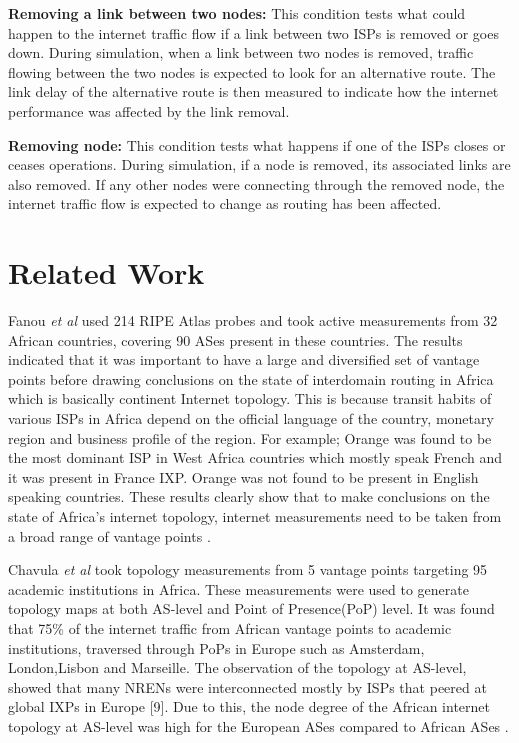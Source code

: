 \textbf{Removing a link between two nodes:} This condition tests what could happen to the internet traffic flow if a link between two ISPs  is removed or goes down. During simulation, when a link between two nodes is removed, traffic flowing between the two nodes is expected to look for an alternative route. The link delay of the alternative route is then measured to indicate how the internet performance was affected by the link removal. 

\textbf{Removing node:} This condition tests what happens if one of the ISPs closes or ceases operations. During simulation, if a node is removed, its associated links are also removed. If any other nodes were connecting through the removed node, the internet traffic flow is expected to change as routing has been affected.  


\section{Related Work}\label{sec:Related Work}
Fanou \textit{et al} \cite{Africa3} used 214 RIPE Atlas probes and took active measurements from 32 African countries, covering 90 ASes present in these countries. The results indicated that it was important to have a large and diversified set of vantage points before drawing conclusions on the state of interdomain routing in Africa which is basically continent Internet topology. This is because transit habits of various ISPs in Africa depend on the official language of the country, monetary region and business profile of the region. For example; Orange was found to be the most dominant ISP in West Africa countries which mostly speak French and it was present in France IXP. Orange was not found to be present in English speaking countries. These results clearly show that to make conclusions on the state of Africa’s internet topology, internet measurements need to be taken from a broad range of vantage points \cite{Africa3}.

Chavula \textit{et al} \cite{Africa2}  took topology measurements from 5 vantage points targeting 95 academic institutions in Africa. These measurements were used to generate topology maps at both AS-level and Point of Presence(PoP) level. It was found that 75\% of the internet traffic from African vantage points to academic institutions, traversed through PoPs in Europe such as Amsterdam, London,Lisbon and Marseille. The observation of the topology at AS-level, showed that many NRENs were interconnected mostly by ISPs that peered at global IXPs in Europe [9]. Due to this, the node degree of the African internet topology at AS-level was high for the European ASes compared to African ASes \cite{Africa2}.

